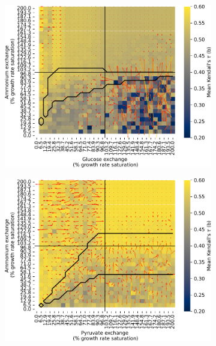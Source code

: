 \begin{figure}[htb!]
  \begin{subfigure}[t]{0.45\textwidth}
  \centering
    \includegraphics[width=\linewidth]{ec_grid_glc_amm_kendall}
    \caption{
    }
    \label{fig:model-noisy-glc-kendall}
  \end{subfigure}%
  \begin{subfigure}[t]{0.45\textwidth}
  \centering
    \includegraphics[width=\linewidth]{ec_grid_pyr_amm_kendall}
    \caption{
    }
    \label{fig:model-noisy-pyr-kendall}
  \end{subfigure}


\end{figure}
